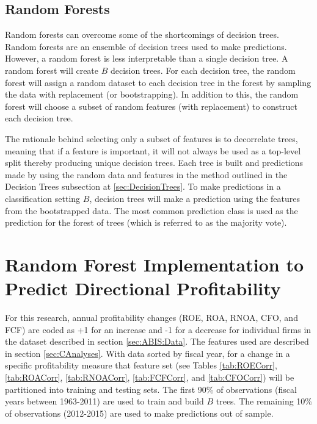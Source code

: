 \subsection{Random Forests} \label{sec:RandomForest}

Random forests can overcome some of the shortcomings of decision trees.  Random forests are an ensemble of decision trees used to make predictions. However, a random forest is less interpretable than a single decision tree.  A random forest will create \(B\) decision trees.  For each decision tree,  the random forest will assign a random dataset to each decision tree in the forest by sampling the data with replacement (or bootstrapping). In addition to this, the random forest will choose a subset of random features (with replacement) to construct each decision tree. 
 
The rationale behind selecting only a subset of features is to decorrelate trees, meaning that if a feature is important, it will not always be used as a top-level split thereby producing unique decision trees. Each tree is built and predictions made by using the random data and features in the method outlined in the Decision Trees subsection at \ref{sec:DecisionTrees}. To make predictions in a classification setting \(B\), decision trees will make a prediction using the features from the bootstrapped data. The most common prediction class is used as the prediction for the forest of trees (which is referred to as the majority vote).


\section{Random Forest Implementation to Predict Directional Profitability}

For this research, annual profitability changes (ROE, ROA, RNOA, CFO, and FCF) are coded as +1 for an increase and -1 for a decrease for individual firms in the dataset described in section \ref{sec:ABIS:Data}. The features used are described in section \ref{sec:CAnalyses}. With data sorted by fiscal year, for a change in a specific profitability measure that feature set (see Tables \ref{tab:ROECorr},  \ref{tab:ROACorr},  \ref{tab:RNOACorr},  \ref{tab:FCFCorr}, and \ref{tab:CFOCorr}) will be partitioned into training and testing sets. The first 90\% of observations (fiscal years between 1963-2011) are used to train and build \(B\) trees.  The remaining 10\% of observations (2012-2015) are used to make predictions out of sample. 


